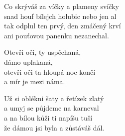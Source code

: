 
\ve{}
Co skrýváš za víčky a plameny svíčky\\
snad houf bílejch holubic nebo jen al\\
tak odplul ten prvý, den zmáčený krví\\
ani pouťovou panenku nezanechal.

\cho{}
Otevři oči, ty uspěchaná,\\
dámo uplakaná,\\
otevři oči ta hloupá noc končí\\
a mír je mezi náma.

\ve{}
Už si oblékni šaty a řetízek zlatý\\
a umyj se půjdeme na karneval\\
a na bílou kůži ti napíšu tuší\\
že dámou jsi byla a zůstáváš dál.

\cho{}

\esong{}